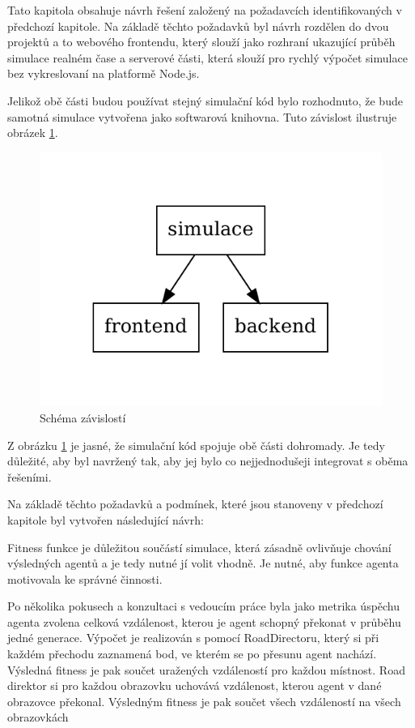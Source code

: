 Tato kapitola obsahuje návrh řešení založený na požadavcích identifikovaných v předchozí kapitole. Na základě těchto požadavků byl návrh rozdělen do dvou projektů a to webového frontendu, který slouží jako rozhraní ukazující průběh simulace realném čase a serverové části, která slouží pro rychlý výpočet simulace bez vykreslovaní na platformě Node.js.

Jelikož obě části budou používat stejný simulační kód bylo rozhodnuto, že bude samotná simulace vytvořena jako softwarová knihovna. Tuto závislost ilustruje obrázek \ref{fig:dependency}.
\begin{figure}[h!]
	\centering
	\includegraphics[width=0.4\linewidth]{architektura}
	\caption{Schéma závislostí}
	\label{fig:dependency}
\end{figure}


Z obrázku \ref{fig:dependency} je jasné, že simulační kód spojuje obě části dohromady. Je tedy důležité, aby byl navržený tak, aby jej bylo co nejjednodušeji integrovat s oběma řešeními.

Na základě těchto požadavků a podmínek, které jsou stanoveny v předchozí kapitole byl vytvořen následující návrh:


Fitness funkce je důležitou součástí simulace, která zásadně ovlivňuje chování výsledných agentů a je tedy nutné jí volit vhodně. Je nutné, aby funkce agenta motivovala ke správné činnosti.

Po několika pokusech a konzultaci s vedoucím práce byla jako metrika úspěchu agenta zvolena celková vzdálenost, kterou je agent schopný překonat v průběhu jedné generace. Výpočet je realizován s pomocí RoadDirectoru, který si při každém přechodu zaznamená bod, ve kterém se po přesunu agent nachází. Výsledná fitness je pak součet uražených vzdáleností pro každou místnost. Road direktor si pro každou obrazovku uchovává vzdálenost, kterou agent v dané obrazovce překonal. Výsledným fitness je pak součet všech vzdáleností na všech obrazovkách

